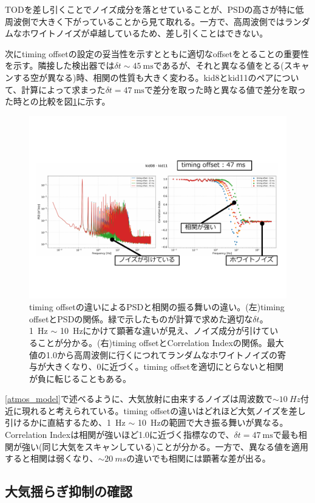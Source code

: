 TODを差し引くことでノイズ成分を落とせていることが、PSDの高さが特に低周波側で大きく下がっていることから見て取れる。一方で、高周波側ではランダムなホワイトノイズが卓越しているため、差し引くことはできない。

次にtiming offsetの設定の妥当性を示すとともに適切なoffsetをとることの重要性を示す。隣接した検出器では$\delta t\sim\SI{45}{\mathrm{ms}}$であるが、それと異なる値をとる(スキャンする空が異なる)時、相関の性質も大きく変わる。kid8とkid11のペアについて、計算によって求まった$\delta t=\SI{47}{\mathrm{ms}}$で差分を取った時と異なる値で差分を取った時との比較を図\ref{timing_offset_compare}に示す。
\begin{figure}[htbp]
  \centering
  \includegraphics[width=1.05\columnwidth]{5_alignment/figs/timing_offset_compare.pdf}
  \caption{timing offsetの違いによるPSDと相関の振る舞いの違い。(左)timing offsetとPSDの関係。緑で示したものが計算で求めた適切な$\delta t$。\SI{1}{Hz} $\sim$ \SI{10}{Hz}にかけて顕著な違いが見え、ノイズ成分が引けていることが分かる。(右)timing offsetとCorrelation Indexの関係。最大値の1.0から高周波側に行くにつれてランダムなホワイトノイズの寄与が大きくなり、0に近づく。timing offsetを適切にとらないと相関が負に転じることもある。}
  \label{timing_offset_compare}
\end{figure}
\ref{atmos_model}で述べるように、大気放射に由来するノイズは周波数で$\sim\SI{10}{Hz}$付近に現れると考えられている。timing offsetの違いはどれほど大気ノイズを差し引けるかに直結するため、\SI{1}{Hz} $\sim$ \SI{10}{Hz}の範囲で大き振る舞いが異なる。Correlation Indexは相関が強いほど1.0に近づく指標なので、$\delta t=\SI{47}{\mathrm{ms}}$で最も相関が強い(同じ大気をスキャンしている)ことが分かる。一方で、異なる値を適用すると相関は弱くなり、$\sim\SI{20}{ms}$の違いでも相関には顕著な差が出る。



\subsection{大気揺らぎ抑制の確認}
